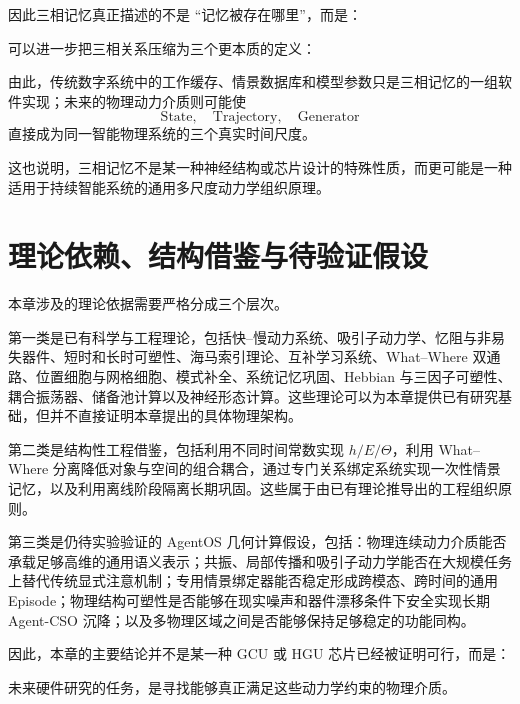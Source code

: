 因此三相记忆真正描述的不是 ``记忆被存在哪里''，而是：
\begin{statementbox}
\centering
{}
\end{statementbox}

可以进一步把三相关系压缩为三个更本质的定义：
\begin{statementbox}
\centering
{}
\end{statementbox}
\begin{statementbox}
\centering
{}
\end{statementbox}
\begin{statementbox}
\centering
{}
\end{statementbox}

由此，传统数字系统中的工作缓存、情景数据库和模型参数只是三相记忆的一组软件实现；未来的物理动力介质则可能使
\[
\mathrm{State},
\quad
\mathrm{Trajectory},
\quad
\mathrm{Generator}
\]
直接成为同一智能物理系统的三个真实时间尺度。

这也说明，三相记忆不是某一种神经结构或芯片设计的特殊性质，而更可能是一种适用于持续智能系统的通用多尺度动力学组织原理。

\section{理论依赖、结构借鉴与待验证假设}

本章涉及的理论依据需要严格分成三个层次。

第一类是已有科学与工程理论，包括快--慢动力系统、吸引子动力学、忆阻与非易失器件、短时和长时可塑性、海马索引理论、互补学习系统、What--Where 双通路、位置细胞与网格细胞、模式补全、系统记忆巩固、Hebbian 与三因子可塑性、耦合振荡器、储备池计算以及神经形态计算。这些理论可以为本章提供已有研究基础，但并不直接证明本章提出的具体物理架构。

第二类是结构性工程借鉴，包括利用不同时间常数实现 $h/E/\Theta$，利用 What--Where 分离降低对象与空间的组合耦合，通过专门关系绑定系统实现一次性情景记忆，以及利用离线阶段隔离长期巩固。这些属于由已有理论推导出的工程组织原则。

第三类是仍待实验验证的 AgentOS 几何计算假设，包括：物理连续动力介质能否承载足够高维的通用语义表示；共振、局部传播和吸引子动力学能否在大规模任务上替代传统显式注意机制；专用情景绑定器能否稳定形成跨模态、跨时间的通用 Episode；物理结构可塑性是否能够在现实噪声和器件漂移条件下安全实现长期 Agent-CSO 沉降；以及多物理区域之间是否能够保持足够稳定的功能同构。

因此，本章的主要结论并不是某一种 GCU 或 HGU 芯片已经被证明可行，而是：
\begin{statementbox}
\centering
{}
\end{statementbox}

未来硬件研究的任务，是寻找能够真正满足这些动力学约束的物理介质。